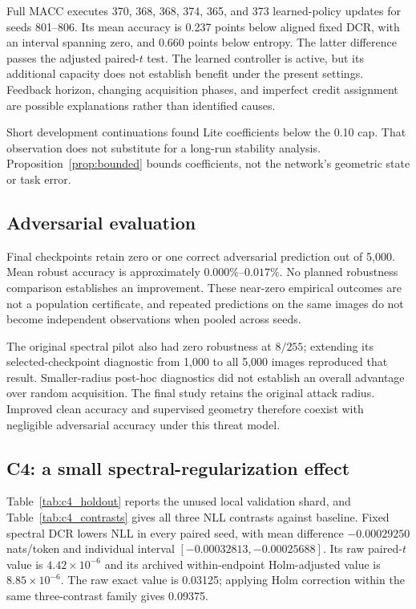 \documentclass[a4paper,fleqn]{cas-dc}
\begin{document}
Full MACC executes 370, 368, 368, 374, 365, and 373
learned-policy updates for seeds 801--806.
Its mean accuracy is 0.237 points below aligned fixed DCR,
with an interval spanning zero, and 0.660 points below entropy.
The latter difference passes the adjusted paired-$t$ test.
The learned controller is active, but its additional capacity
does not establish benefit under the present settings.
Feedback horizon, changing acquisition phases, and imperfect
credit assignment are possible explanations rather than
identified causes.

Short development continuations found Lite coefficients below
the 0.10 cap. That observation does not substitute for a
long-run stability analysis.
Proposition~\ref{prop:bounded} bounds coefficients,
not the network's geometric state or task error.

\subsection{Adversarial evaluation}

Final checkpoints retain zero or one correct adversarial
prediction out of 5,000. Mean robust accuracy is approximately
$0.000\%$--$0.017\%$.
No planned robustness comparison establishes an improvement.
These near-zero empirical outcomes are not a population
certificate, and repeated predictions on the same images
do not become independent observations when pooled across seeds.

The original spectral pilot also had zero robustness at
$8/255$; extending its selected-checkpoint diagnostic from
1,000 to all 5,000 images reproduced that result.
Smaller-radius post-hoc diagnostics did not establish an
overall advantage over random acquisition.
The final study retains the original attack radius.
Improved clean accuracy and supervised geometry therefore coexist
with negligible adversarial accuracy under this threat model.

\FloatBarrier
\subsection{C4: a small spectral-regularization effect}
\label{sec:c4_results}

Table~\ref{tab:c4_holdout} reports the unused local validation shard, and
Table~\ref{tab:c4_contrasts} gives all three NLL contrasts against baseline.
Fixed spectral DCR lowers NLL in every paired seed, with mean difference
$-0.00029250$ nats/token and individual interval
$[-0.00032813,-0.00025688]$. Its raw paired-$t$ value is
$4.42\times10^{-6}$ and its archived within-endpoint Holm-adjusted value is
$8.85\times10^{-6}$. The raw exact value is 0.03125; applying Holm
correction within the same three-contrast family gives 0.09375.
\end{document}
